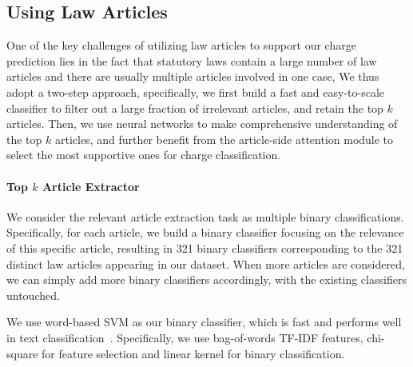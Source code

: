 \subsection{Using Law Articles} 
One of the key challenges of utilizing law articles to support our charge prediction lies in the fact that statutory laws contain a large number of law articles and there are usually multiple articles involved in one case,  %
%
We thus adopt a two-step approach, %
specifically, we first build a fast and easy-to-scale classifier to filter out a large fraction of irrelevant articles, and retain the top $k$ articles. Then, we use neural networks to make comprehensive understanding of the top $k$ articles, and further benefit from the article-side attention module to select the most supportive ones for charge classification.

\paragraph{Top $k$ Article Extractor}
\label{sec_article_extractor}
We consider the relevant article extraction task as multiple binary classifications. Specifically, for each article, we build a binary classifier focusing on the relevance of this specific article, resulting in 321 binary classifiers corresponding to the 321 distinct law articles 
appearing in our dataset.
When more articles are considered,
we can simply add more binary classifiers accordingly, with the existing classifiers untouched.

We use word-based SVM as our binary classifier, which is fast and performs well in text classification~\cite{joachims2002learning,wang2012baselines}. Specifically, we use bag-of-words TF-IDF features, chi-square for feature selection and linear kernel for binary classification. 



